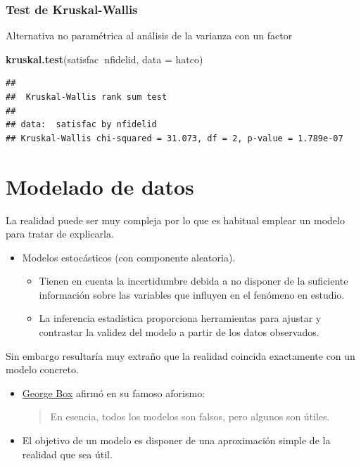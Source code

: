 \documentclass[]{book}
\newenvironment{Shaded}{\begin{snugshade}}{\end{snugshade}}
\newcommand{\DataTypeTok}[1]{\textcolor[rgb]{0.13,0.29,0.53}{#1}}
\newcommand{\KeywordTok}[1]{\textcolor[rgb]{0.13,0.29,0.53}{\textbf{#1}}}
\newcommand{\NormalTok}[1]{#1}
\newcommand{\OperatorTok}[1]{\textcolor[rgb]{0.81,0.36,0.00}{\textbf{#1}}}
\begin{document}
\hypertarget{test-de-kruskal-wallis}{%
\subsection{Test de Kruskal-Wallis}\label{test-de-kruskal-wallis}}

Alternativa no paramétrica al análisis de la varianza con un factor

\begin{Shaded}
\begin{Highlighting}[]
\KeywordTok{kruskal.test}\NormalTok{(satisfac}\OperatorTok{~}\NormalTok{nfidelid, }\DataTypeTok{data =}\NormalTok{ hatco)}
\end{Highlighting}
\end{Shaded}

\begin{verbatim}
## 
##  Kruskal-Wallis rank sum test
## 
## data:  satisfac by nfidelid
## Kruskal-Wallis chi-squared = 31.073, df = 2, p-value = 1.789e-07
\end{verbatim}

\hypertarget{modelado-de-datos}{%
\chapter{Modelado de datos}\label{modelado-de-datos}}

La realidad puede ser muy compleja por lo que es habitual emplear un
modelo para tratar de explicarla.

\begin{itemize}
\item
  Modelos estocásticos (con componente aleatoria).

  \begin{itemize}
  \item
    Tienen en cuenta la incertidumbre debida a no disponer de la suficiente información
    sobre las variables que influyen en el fenómeno en estudio.
  \item
    La inferencia estadística proporciona herramientas para ajustar y
    contrastar la validez del modelo a partir de los datos observados.
  \end{itemize}
\end{itemize}

Sin embargo resultaría muy extraño que la realidad coincida exactamente con un modelo concreto.

\begin{itemize}
\item
  \href{https://en.wikipedia.org/wiki/George_E._P._Box}{George Box} afirmó en su famoso aforismo:

  \begin{quote}
  En esencia, todos los modelos son falsos, pero algunos son útiles.
  \end{quote}
\item
  El objetivo de un modelo es disponer de una aproximación simple de la realidad que sea útil.
\end{itemize}
\end{document}
